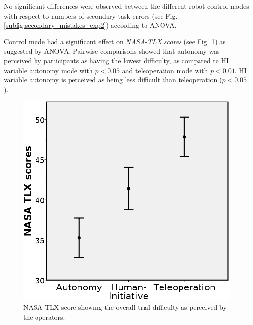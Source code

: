 \documentclass[a4paper,12pt,oneside,openright]{bhamthesis}
\begin{document}
No significant differences were observed between the different robot control modes with respect to numbers of secondary task errors (see Fig. \ref{subfig:secondary_mistakes_exp2}) according to ANOVA.

Control mode had a significant effect on \textit{NASA-TLX scores} (see Fig. \ref{fig:NASA-TLX_exp2}) as suggested by ANOVA. Pairwise comparisons showed that autonomy was perceived by participants as having the lowest difficulty, as compared to HI variable autonomy mode with $p < 0.05$ and teleoperation mode with $p < 0.01$. HI variable autonomy is perceived as being less difficult than teleoperation ($p < 0.05$). 

\begin{figure}
	\centering
	\includegraphics[width=0.49\columnwidth]{chapter4_fig/NasaTLX.png}
	\caption{NASA-TLX score showing the overall trial difficulty as perceived by the operators.} 
	\label{fig:NASA-TLX_exp2}
\end{figure}
\end{document}
